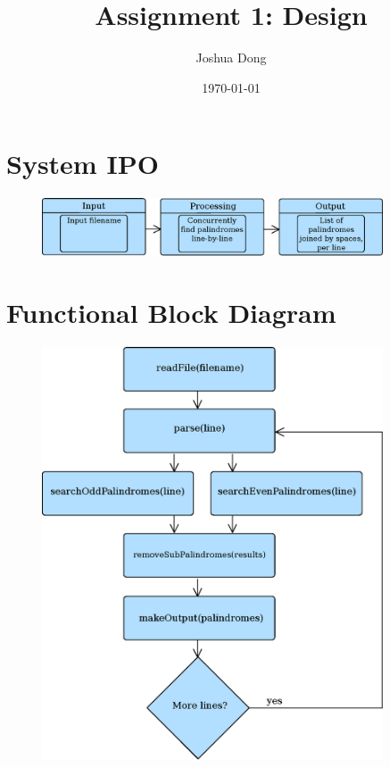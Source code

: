 \documentclass{article}
\begin{document}
\title{\vspace{-60pt}Assignment 1: Design\vspace{-2ex}}
\author{Joshua Dong}
\date{\vspace{-2ex}\today}
\maketitle

\section{System IPO}
\vspace{-12pt}
\begin{figure}[h]
  \centering
  \includegraphics[width=0.9\textwidth]{IPO.eps}
\end{figure}


\section{Functional Block Diagram}
\vspace{-12pt}
\begin{figure}[h]
  \centering
  \includegraphics[width=0.9\textwidth]{FunctionalBlocks.eps}
  \vspace{-100pt}
\end{figure}
\end{document}

